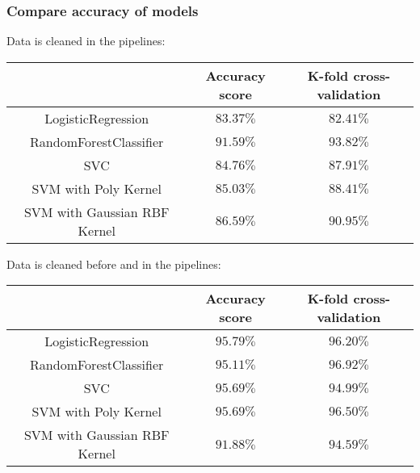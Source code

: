 \documentclass[10pt]{beamer}
\theoremstyle{definition}
\theoremstyle{remark}
\numberwithin{equation}{section}
\begin{document}
\begin{frame}
	\frametitle{Compare accuracy of models}
	Data is cleaned in the pipelines:
		\begin{center}
		\begin{tabular}{ | c | c| c | } 
			\hline
			& Accuracy score & K-fold cross-validation \\ 
			\hline
			LogisticRegression & $83.37 \%$ & $82.41 \%$ \\ 
			\hline
			RandomForestClassifier & $91.59 \%$ & $93.82 \%$ \\ 
			\hline
			SVC & $84.76 \%$ & $87.91 \%$ \\ 
			\hline
			SVM with Poly Kernel & $85.03 \%$ & $88.41 \%$  \\ 
			\hline
			SVM with Gaussian RBF Kernel & $86.59 \%$ & $90.95 \%$  \\ 
			\hline
		\end{tabular}
	\end{center}
	Data is cleaned before and in the pipelines:
		\begin{center}
		\begin{tabular}{ | c | c| c | } 
			\hline
			& Accuracy score & K-fold cross-validation \\ 
			\hline
			LogisticRegression & $95.79 \%$ & $96.20 \%$ \\ 
			\hline
			RandomForestClassifier & $95.11 \%$ & $96.92 \%$ \\ 
			\hline
			SVC & $95.69 \%$ & $94.99 \%$ \\ 
			\hline
			SVM with Poly Kernel & $95.69 \%$ & $96.50 \%$  \\ 
			\hline
			SVM with Gaussian RBF Kernel & $91.88 \%$ & $94.59 \%$  \\ 
			\hline
		\end{tabular}
	\end{center}

\end{frame}


\begin{frame}
	
\end{frame}
\end{document}
